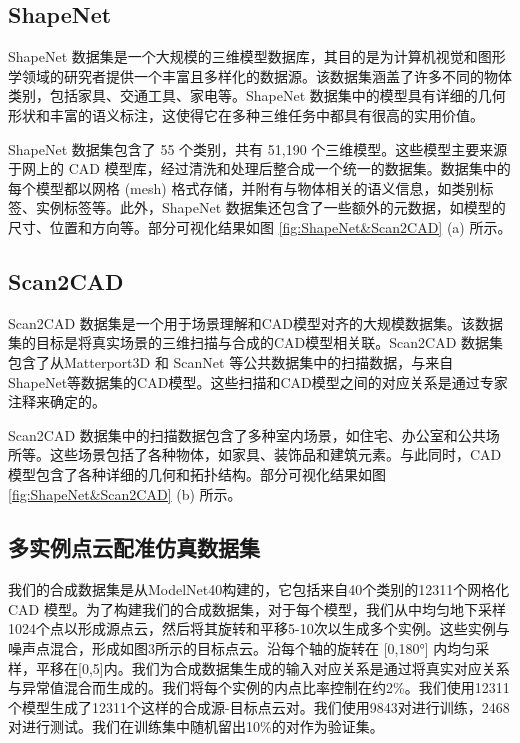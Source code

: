 \subsection{ShapeNet}
ShapeNet 数据集是一个大规模的三维模型数据库，其目的是为计算机视觉和图形学领域的研究者提供一个丰富且多样化的数据源。该数据集涵盖了许多不同的物体类别，包括家具、交通工具、家电等。ShapeNet 数据集中的模型具有详细的几何形状和丰富的语义标注，这使得它在多种三维任务中都具有很高的实用价值。

ShapeNet 数据集包含了 55 个类别，共有 51,190 个三维模型。这些模型主要来源于网上的 CAD 模型库，经过清洗和处理后整合成一个统一的数据集。数据集中的每个模型都以网格 (mesh) 格式存储，并附有与物体相关的语义信息，如类别标签、实例标签等。此外，ShapeNet 数据集还包含了一些额外的元数据，如模型的尺寸、位置和方向等。部分可视化结果如图 \ref{fig:ShapeNet&Scan2CAD} (a) 所示。

\subsection{Scan2CAD}
Scan2CAD 数据集是一个用于场景理解和CAD模型对齐的大规模数据集。该数据集的目标是将真实场景的三维扫描与合成的CAD模型相关联。Scan2CAD 数据集包含了从Matterport3D\cite{chang2017matterport3d} 和 ScanNet\cite{dai2017scannet} 等公共数据集中的扫描数据，与来自ShapeNet等数据集的CAD模型。这些扫描和CAD模型之间的对应关系是通过专家注释来确定的。

Scan2CAD 数据集中的扫描数据包含了多种室内场景，如住宅、办公室和公共场所等。这些场景包括了各种物体，如家具、装饰品和建筑元素。与此同时，CAD模型包含了各种详细的几何和拓扑结构。部分可视化结果如图 \ref{fig:ShapeNet&Scan2CAD} (b) 所示。

\subsection{多实例点云配准仿真数据集}
我们的合成数据集是从ModelNet40构建的，它包括来自40个类别的12311个网格化 CAD 模型。为了构建我们的合成数据集，对于每个模型，我们从中均匀地下采样1024个点以形成源点云，然后将其旋转和平移5-10次以生成多个实例。这些实例与噪声点混合，形成如图3所示的目标点云。沿每个轴的旋转在 [0,180°] 内均匀采样，平移在[0,5]内。我们为合成数据集生成的输入对应关系是通过将真实对应关系与异常值混合而生成的。我们将每个实例的内点比率控制在约2\%。我们使用12311个模型生成了12311个这样的合成源-目标点云对。我们使用9843对进行训练，2468对进行测试。我们在训练集中随机留出10\%的对作为验证集。


